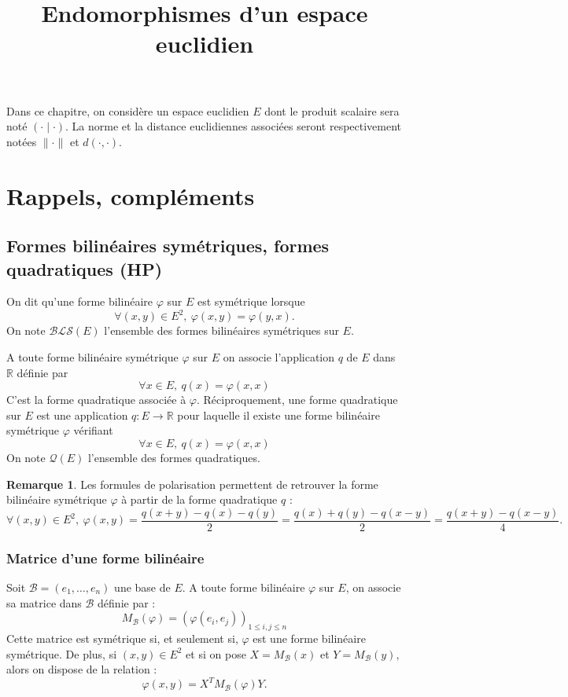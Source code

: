 \documentclass[french]{article}
\title{Endomorphismes d'un espace euclidien}
\date{}
\newcommand{\R}{\mathbb{R}}
\theoremstyle{plain}
\theoremstyle{definition}
\newtheorem*{rmq}{Remarque}
\theoremstyle{remark}
\begin{document}
\tableofcontents

\newpage
\maketitle
Dans ce chapitre, on considère un espace euclidien $E$ dont le produit scalaire sera noté $(\cdot\mid\cdot)$. La norme et la distance euclidiennes associées seront respectivement notées $\lVert\cdot\rVert$ et $d(\cdot,\cdot)$.

\section{Rappels, compléments}

\subsection{Formes bilinéaires symétriques, formes quadratiques (HP)}

\begin{dfn}
	On dit qu'une forme bilinéaire $\varphi$ sur $E$ est symétrique lorsque $$\forall (x,y)\in E^2,\ \varphi(x,y)=\varphi(y,x).$$ On note $\mathcal{BLS}(E)$ l'ensemble des formes bilinéaires symétriques sur $E$.
\end{dfn}

\begin{dfn}
	A toute forme bilinéaire symétrique $\varphi$ sur $E$ on associe l'application $q$ de $E$ dans $\R$ définie par $$\forall x\in E,\ q(x)=\varphi(x,x)$$ C'est la forme quadratique associée à $\varphi$. Réciproquement, une forme quadratique sur $E$ est une application $q:E\to\R$ pour laquelle il existe une forme bilinéaire symétrique $\varphi$ vérifiant $$\forall x\in E,\ q(x)=\varphi(x,x)$$ On note $\mathcal{Q}(E)$ l'ensemble des formes quadratiques.
\end{dfn}

\begin{rmq}
	Les formules de polarisation permettent de retrouver la forme bilinéaire symétrique $\varphi$ à partir de la forme quadratique $q$ : $$\forall (x,y)\in E^2,\ \varphi(x,y)=\frac{q(x+y)-q(x)-q(y)}{2}=\frac{q(x)+q(y)-q(x-y)}{2}=\frac{q(x+y)-q(x-y)}{4}.$$
\end{rmq}

\subsubsection*{Matrice d'une forme bilinéaire}
Soit $\mathcal{B}=(e_1,\ldots,e_n)$ une base de $E$. A toute forme bilinéaire $\varphi$ sur $E$, on associe sa matrice dans $\mathcal{B}$ définie par : $$M_\mathcal{B}(\varphi)=\left(\varphi(e_i,e_j)\right)_{1\leqslant i,j\leqslant n}$$ Cette matrice est symétrique si, et seulement si, $\varphi$ est une forme bilinéaire symétrique. De plus, si $(x,y)\in E^2$ et si on pose $X=M_\mathcal{B}(x)$ et $Y=M_\mathcal{B}(y)$, alors on dispose de la relation : $$\varphi(x,y)=X^TM_\mathcal{B}(\varphi)Y.$$
\end{document}
